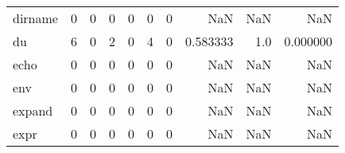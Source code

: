 \begin{tabular}{lrrrrrrrrr}
dirname   &                                       0 &                                                  0 &                                                  0 &                                                  0 &                                                  0 &                                                  0 &                                                NaN &                                    NaN &                                  NaN \\
du        &                                       6 &                                                  0 &                                                  2 &                                                  0 &                                                  4 &                                                  0 &                                           0.583333 &                                    1.0 &                             0.000000 \\
echo      &                                       0 &                                                  0 &                                                  0 &                                                  0 &                                                  0 &                                                  0 &                                                NaN &                                    NaN &                                  NaN \\
env       &                                       0 &                                                  0 &                                                  0 &                                                  0 &                                                  0 &                                                  0 &                                                NaN &                                    NaN &                                  NaN \\
expand    &                                       0 &                                                  0 &                                                  0 &                                                  0 &                                                  0 &                                                  0 &                                                NaN &                                    NaN &                                  NaN \\
expr      &                                       0 &                                                  0 &                                                  0 &                                                  0 &                                                  0 &                                                  0 &                                                NaN &                                    NaN &                                  NaN \\

\end{tabular}
